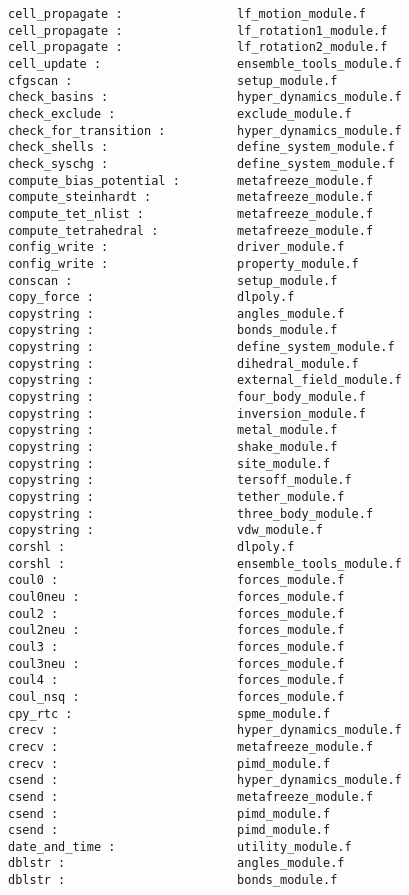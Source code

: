 \begin{verbatim}
cell_propagate :                lf_motion_module.f
cell_propagate :                lf_rotation1_module.f
cell_propagate :                lf_rotation2_module.f
cell_update :                   ensemble_tools_module.f
cfgscan :                       setup_module.f
check_basins :                  hyper_dynamics_module.f
check_exclude :                 exclude_module.f
check_for_transition :          hyper_dynamics_module.f
check_shells :                  define_system_module.f
check_syschg :                  define_system_module.f
compute_bias_potential :        metafreeze_module.f
compute_steinhardt :            metafreeze_module.f
compute_tet_nlist :             metafreeze_module.f
compute_tetrahedral :           metafreeze_module.f
config_write :                  driver_module.f
config_write :                  property_module.f
conscan :                       setup_module.f
copy_force :                    dlpoly.f
copystring :                    angles_module.f
copystring :                    bonds_module.f
copystring :                    define_system_module.f
copystring :                    dihedral_module.f
copystring :                    external_field_module.f
copystring :                    four_body_module.f
copystring :                    inversion_module.f
copystring :                    metal_module.f
copystring :                    shake_module.f
copystring :                    site_module.f
copystring :                    tersoff_module.f
copystring :                    tether_module.f
copystring :                    three_body_module.f
copystring :                    vdw_module.f
corshl :                        dlpoly.f
corshl :                        ensemble_tools_module.f
coul0 :                         forces_module.f
coul0neu :                      forces_module.f
coul2 :                         forces_module.f
coul2neu :                      forces_module.f
coul3 :                         forces_module.f
coul3neu :                      forces_module.f
coul4 :                         forces_module.f
coul_nsq :                      forces_module.f
cpy_rtc :                       spme_module.f
crecv :                         hyper_dynamics_module.f
crecv :                         metafreeze_module.f
crecv :                         pimd_module.f
csend :                         hyper_dynamics_module.f
csend :                         metafreeze_module.f
csend :                         pimd_module.f
csend :                         pimd_module.f
date_and_time :                 utility_module.f
dblstr :                        angles_module.f 
dblstr :                        bonds_module.f 

\end{verbatim}
